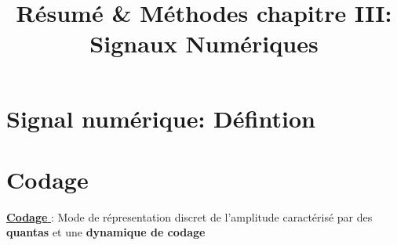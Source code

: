 \documentclass[11pt,a4paper]{article}
\begin{document}
\title{Résumé \& Méthodes chapitre III: Signaux Numériques}
\maketitle

\section{Signal numérique: Défintion}
\vspace{0.3cm}
\begin{center}
\end{center}
\vspace{0.3cm}
\section{Codage}
\underline{\textbf{Codage }}: Mode de répresentation discret de l'amplitude caractérisé par des \textbf{quantas} et une \textbf{dynamique de codage}\\

\vspace{0.3cm}
\end{document}
